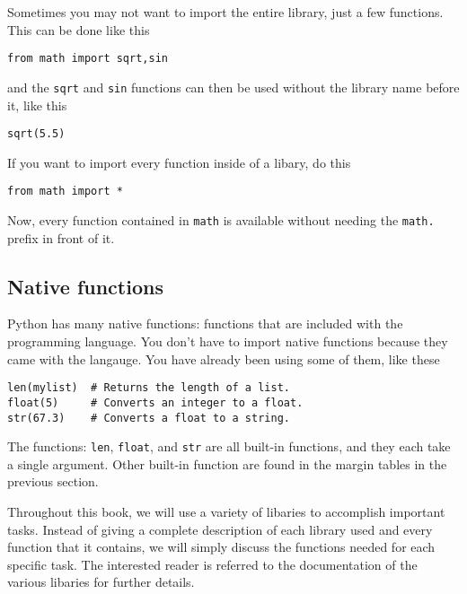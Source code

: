 Sometimes you may not want to import the entire library, just a few
functions. This can be done like this
\begin{Verbatim}
from math import sqrt,sin
\end{Verbatim}
and the \texttt{sqrt} and \texttt{sin} functions can then be used
without the library name before it, like this
\begin{Verbatim}
sqrt(5.5)
\end{Verbatim}
If you want to import every function inside of a libary, do this
\begin{Verbatim}
from math import *
\end{Verbatim}
Now, every function contained in \texttt{math} is available without
needing the \texttt{math.} prefix in front of it. 

\subsection*{Native functions}
Python has many native functions: functions that are included with the
programming language.  You don't have to import native functions
because they came with the langauge.  You have already been using some
of them, like these
\begin{Verbatim}
len(mylist)  # Returns the length of a list.
float(5)     # Converts an integer to a float.
str(67.3)    # Converts a float to a string.
\end{Verbatim}
The functions: \texttt{len}, \texttt{float}, and \texttt{str} are all
built-in functions, and they each take a single argument.  Other
built-in function are found in the margin tables in the previous section.





Throughout this book, we will use a variety of libaries to accomplish
important tasks.  Instead of giving a complete description of each
library used and every function that it contains, we will simply
discuss the functions needed for each specific task.  The interested
reader is referred to the documentation of the various libaries for
further details.










